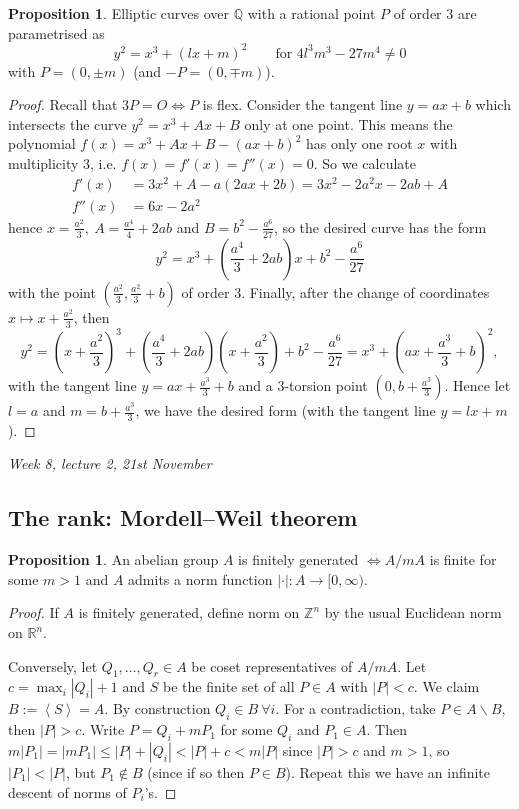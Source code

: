 \documentclass{article}
\newcommand{\Z}{\mathbb{Z}}
\newcommand{\Q}{\mathbb{Q}}
\newcommand{\R}{\mathbb{R}}
\newcommand{\la}{\left\langle}
\newcommand{\ra}{\right\rangle}
\theoremstyle{definition}
\newtheorem{prop}[defn]{Proposition}
\begin{document}
\begin{prop}
Elliptic curves over $\Q$ with a rational point $P$ of order 3 are parametrised as
\[
y^2=x^3+(lx+m)^2\qquad\text{for }4l^3m^3-27m^4\neq 0
\]
with $P=(0,\pm m)$ (and $-P=(0,\mp m)$).
\end{prop}
\begin{proof}
Recall that $3P=O\iff P$ is flex. Consider the tangent line $y=ax+b$ which intersects the curve $y^2=x^3+Ax+B$ only at one point. This means the polynomial $f(x)=x^3+Ax+B-(ax+b)^2$ has only one root $x$ with multiplicity 3, i.e. $f(x)=f'(x)=f''(x)=0$. So we calculate
\[
\begin{aligned}
f'(x)&=3x^2+A-a(2ax+2b)=3x^2-2a^2x-2ab+A \\
f''(x)&=6x-2a^2
\end{aligned}
\]
hence $x=\frac{a^2}{3},\ A=\frac{a^4}{4}+2ab$ and $B=b^2-\frac{a^6}{27}$, so the desired curve has the form
\[
y^2=x^3+\left(\frac{a^4}{3}+2ab\right)x+b^2-\frac{a^6}{27}
\]
with the point $\left(\frac{a^2}{3},\frac{a^2}{3}+b\right)$ of order 3. Finally, after the change of coordinates $x\mapsto x+\frac{a^2}{3}$, then
\[
y^2=\left(x+\frac{a^2}{3}\right)^3+\left(\frac{a^4}{3}+2ab\right)\left(x+\frac{a^2}{3}\right)+b^2-\frac{a^6}{27}=x^3+\left(ax+\frac{a^3}{3}+b\right)^2,
\]
with the tangent line $y=ax+\frac{a^3}{3}+b$ and a 3-torsion point $\left(0,b+\frac{a^3}{3}\right)$. Hence let $l=a$ and $m=b+\frac{a^3}{3}$, we have the desired form (with the tangent line $y=lx+m$).
\end{proof}

\begin{flushright}
\textit{Week 8, lecture 2, 21st November}
\end{flushright}

\subsection{The rank: Mordell--Weil theorem}

\begin{prop}
\label{prop:fgabelgpcriterion}
An abelian group $A$ is finitely generated $\iff A/mA$ is finite for some $m>1$ and $A$ admits a norm function $|\cdot|:A\rightarrow [0,\infty)$.
\end{prop}
\begin{proof}
If $A$ is finitely generated, define norm on $\Z^n$ by the usual Euclidean norm on $\R^n$.

Conversely, let $Q_1,\ldots,Q_r\in A$ be coset representatives of $A/mA$. Let $c=\max_i|Q_i|+1$ and $S$ be the finite set of all $P\in A$ with $|P|<c$. We claim $B:=\la S\ra=A$. By construction $Q_i\in B \ \forall i$. For a contradiction, take $P\in A\backslash B$, then $|P|>c$. Write $P=Q_i+mP_1$ for some $Q_i$ and $P_1\in A$. Then $m|P_1|=|mP_1|\leq |P|+|Q_i|<|P|+c<m|P|$ since $|P|>c$ and $m>1$, so $|P_1|<|P|$, but $P_1\notin B$ (since if so then $P\in B$). Repeat this we have an infinite descent of norms of $P_i$'s. 
\end{proof}
\end{document}
